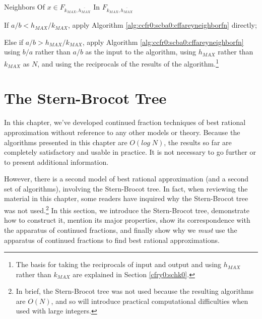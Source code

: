 \begin{vworkalgorithmstatementpar}{Neighbors Of 
                                   \mbox{\boldmath $x \in F_{k_{MAX},\overline{h_{MAX}}}$} 
                                   In \mbox{\boldmath $F_{k_{MAX},\overline{h_{MAX}}}$}}
\label{alg:ccfr0:scba0:cffareyneighborfab}
\begin{alglvl0}
\item If $a/b < h_{MAX}/k_{MAX}$, apply Algorithm 
      \ref{alg:ccfr0:scba0:cffareyneighborfn} directly;

\item Else if $a/b > h_{MAX}/k_{MAX}$, apply Algorithm
      \ref{alg:ccfr0:scba0:cffareyneighborfn} using $b/a$ rather
	  than $a/b$ as the input to the algorithm, using $h_{MAX}$ 
	  rather than $k_{MAX}$ as $N$, and
	  using the reciprocals of the results of the algorithm.\footnote{The
	  basis for taking the reciprocals of input and output and
	  using $h_{MAX}$ rather than $k_{MAX}$ are explained
	  in \cfryzeroxrefcomma{}Section \ref{cfry0:schk0}.}
\end{alglvl0}
\end{vworkalgorithmstatementpar}
\vworkalgorithmfooter{}


\section{The Stern-Brocot Tree}
\label{ccfr0:ssbt0}

In this chapter, we've developed continued fraction techniques of best
rational approximation without reference to any other models or theory.
Because the algorithms presented in this chapter are $O(log \; N)$,
the results so far are completely satisfactory and usable in practice.
It is not necessary to go further or to present additional information.

However, there is a second model of best rational approximation (and a second
set of algorithms), involving
the Stern-Brocot tree.  In fact, when reviewing the material in this
chapter, some readers have inquired why the Stern-Brocot tree was not
used.\footnote{In brief, the Stern-Brocot tree was not used because
the resulting algorithms are $O(N)$, and so will introduce practical
computational difficulties when used with large integers.}  In this
section, we introduce the Stern-Brocot tree, demonstrate how to construct it,
mention its major properties, show its correspondence with the apparatus of
continued fractions, and finally show why we \emph{must} use the apparatus
of continued fractions to find best rational approximations.


